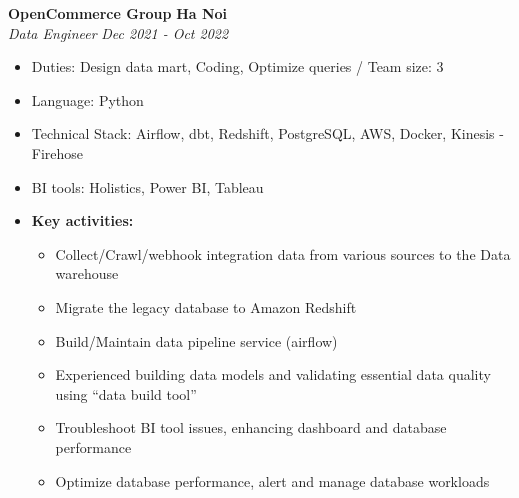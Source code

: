 \documentclass[11pt,a4paper,roman]{moderncv}
\newcommand*{\customcventry}[6][.25em]{%
    {\bfseries #4} \hfill {\bfseries #5} \\
    {\itshape #3} \hfill {\itshape #2}
    \ifx\relax#6\relax\else\\#6\fi
    \par\addvspace{#1}}
\begin{document}
    \customcventry{Dec 2021 - Oct 2022}{Data Engineer}{OpenCommerce Group}{Ha Noi}{}
    \begin{itemize}
        \item Duties: Design data mart, Coding, Optimize queries / Team size: 3
        \item Language: Python
        \item Technical Stack: Airflow, dbt, Redshift, PostgreSQL, AWS, Docker, Kinesis - Firehose
        \item BI tools: Holistics, Power BI, Tableau
        \item \textbf{Key activities:}
        \begin{itemize}
            \item Collect/Crawl/webhook integration data from various sources to the Data warehouse
            \item Migrate the legacy database to Amazon Redshift
            \item Build/Maintain data pipeline service (airflow)
            \item Experienced building data models and validating essential data quality using ``data build tool''
            \item Troubleshoot BI tool issues, enhancing dashboard and database performance
            \item Optimize database performance, alert and manage database workloads
        \end{itemize}
    \end{itemize}
\end{document}
